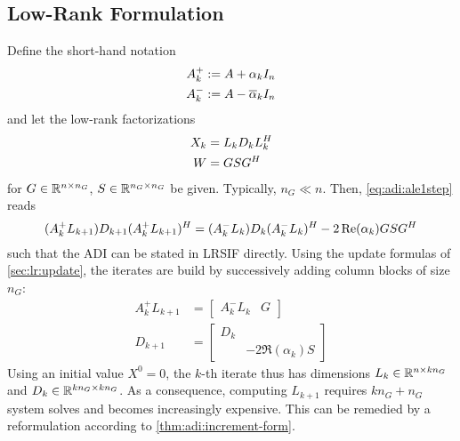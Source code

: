 \subsection{Low-Rank Formulation}

Define the short-hand notation
\begin{equation}
\label{eq:adi:ale:shorthand}
\begin{aligned}
  A^+_k &:= A + \alpha_k I_n \\
  A^-_k &:= A - \conj\alpha_k I_n
\end{aligned}
\end{equation}
and let the low-rank factorizations
\begin{equation*}
\begin{aligned}
  X_k &= L_k D_k L_k^H \\
  W &= GSG^H
\end{aligned}
\end{equation*}
for $G\in\mathbb{R}^{n\times n_G}$, $S\in\mathbb{R}^{n_G\times n_G}$ be given.
Typically, $n_G \ll n$.
Then, \eqref{eq:adi:ale1step} reads
\begin{equation}
  (A_k^+ L_{k+1}) D_{k+1} (A_k^+ L_{k+1})^H
  = (A_k^- L_k) D_k (A_k^- L_k)^H - 2\operatorname{Re}(\alpha_k) GSG^H
\end{equation}
such that
the \ac{ADI} can be stated in \ac{LRSIF} directly.
Using the update formulas of \autoref{sec:lr:update},
the iterates are build by successively adding column blocks of size $n_G$:
\begin{align*}
  A_k^+ L_{k+1} &= \begin{bmatrix}
    A^-_k L_k &
    G
  \end{bmatrix} \\
  D_{k+1} &= \begin{bmatrix}
    D_k \\
    & -2\Re(\alpha_k) S
  \end{bmatrix}
\end{align*}
Using an initial value $X^0=0$,
the $k$-th iterate thus has dimensions $L_k \in\mathbb{R}^{n\times kn_G}$ and $D_k \in\mathbb{R}^{kn_G\times kn_G}$.
As a consequence, computing $L_{k+1}$
requires $kn_G + n_G$ system solves and
becomes increasingly expensive.
This can be remedied by a reformulation according to \autoref{thm:adi:increment-form}.

